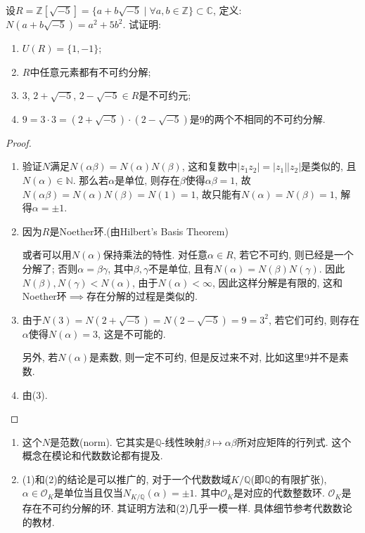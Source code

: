 \begin{problem}
    设$R = \mathbb{Z}[\sqrt{-5}] = \{a + b\sqrt{-5} \mid \forall a, b \in\mathbb{Z}\} \subset \mathbb{C}$,
定义: $N(a + b\sqrt{-5}) = a^2 + 5b^2$. 试证明: 
\begin{enumerate}[(1)]
    \item $U(R) = \{1, -1\}$;
    \item $R$中任意元素都有不可约分解;
    \item $3$, $2 + \sqrt{-5}$, $2 - \sqrt{-5} \in R$是不可约元;
    \item $9 = 3 \cdot 3= (2 + \sqrt{-5}) \cdot (2 - \sqrt{-5})$是$9$的两个不相同的不可约分解.
\end{enumerate}
\end{problem}

\begin{proof}
\begin{enumerate}[(1)]
    \item 验证$N$满足$N(\alpha\beta) = N(\alpha)N(\beta)$, 这和复数中$|z_1z_2| = |z_1||z_2|$是类似的, 且$N(\alpha) \in \mathbb{N}$. 那么若$\alpha$是单位, 则存在$\beta$使得$\alpha\beta = 1$, 故$N(\alpha\beta) = N(\alpha)N(\beta) = N(1) = 1$, 故只能有$N(\alpha) = N(\beta) = 1$, 解得$\alpha = \pm 1$.
    \item 因为$R$是Noether环.(由Hilbert's Basis Theorem)
    
    或者可以用$N(\alpha)$保持乘法的特性. 对任意$\alpha \in R$, 若它不可约, 则已经是一个分解了; 否则$\alpha = \beta\gamma$, 其中$\beta, \gamma$不是单位, 且有$N(\alpha) = N(\beta)N(\gamma)$. 因此$N(\beta), N(\gamma) < N(\alpha)$, 由于$N(\alpha) < \infty$, 因此这样分解是有限的, 这和Noether环$\implies$存在分解的过程是类似的.
    \item 由于$N(3) = N(2 + \sqrt{-5}) = N(2 - \sqrt{-5}) = 9 = 3^2$, 若它们可约, 则存在$\alpha$使得$N(\alpha) = 3$, 这是不可能的.
    
    另外, 若$N(\alpha)$是素数, 则一定不可约, 但是反过来不对, 比如这里$9$并不是素数.
    \item 由(3).
\end{enumerate}
\end{proof}

\begin{remark}
    \begin{enumerate}[1.]
    \item 这个$N$是范数(norm). 它其实是$\mathbb{Q}$-线性映射$\beta \mapsto \alpha\beta$所对应矩阵的行列式. 这个概念在模论和代数数论都有提及.
    \item (1)和(2)的结论是可以推广的, 对于一个代数数域$K/\mathbb{Q}$(即$\mathbb{Q}$的有限扩张), $\alpha \in \mathcal{O}_K$是单位当且仅当$N_{K/\mathbb{Q}}(\alpha) = \pm1$. 其中$\mathcal{O}_K$是对应的代数整数环. $\mathcal{O}_K$是存在不可约分解的环. 其证明方法和(2)几乎一模一样. 具体细节参考代数数论的教材.
    \end{enumerate}
\end{remark}

